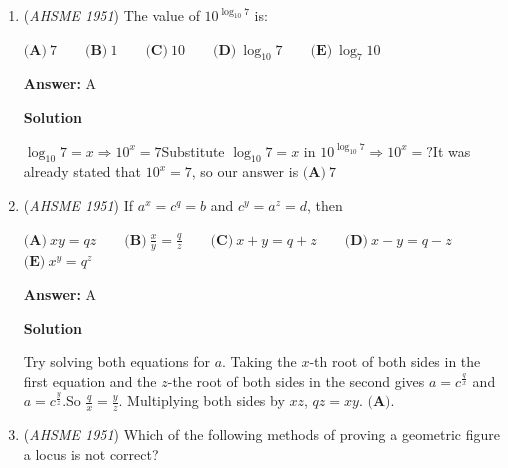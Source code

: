 \begin{enumerate}
 $\textbf{(A)}\ y = x^{2}, y = 2x\qquad\textbf{(B)}\ y = x^{2}-2x, y = 0\qquad\textbf{(C)}\ y = x, y = x-2\qquad\textbf{(D)}\ y = x^{2}-2x+1, y = 1$
$\textbf{(E)}\ y = x^{2}-1, y = 2x-1$


 \textit{[Note: Abscissa means x-coordinate.]}


 
 \textbf{Answer: }C



\textbf{Solution}

If you find the intersections of the curves listed in the answers $\textbf{(A)}$, $\textbf{(B)}$, $\textbf{(D)}$, and $\textbf{(E)}$, you will find that their abscissas are $0$ and $2$. Also you can note that the curves in $\textbf{(C)}$ don't actually intersect. Therefore the answer is $\boxed{\textbf{(C)}}$.

 


	\item (\textit{AHSME 1951}) The value of $10^{\log_{10}7}$ is: 


 $\textbf{(A)}\ 7\qquad\textbf{(B)}\ 1\qquad\textbf{(C)}\ 10\qquad\textbf{(D)}\ \log_{10}7\qquad\textbf{(E)}\ \log_{7}10$

 \textbf{Answer: }A



\textbf{Solution}

$\log_{10}7=x \Rightarrow 10^x=7$Substitute $\log_{10}7=x$ in $10^{\log_{10}7} \Rightarrow 10^x=?$It was already stated that $10^x=7$, so our answer is $\textbf{(A)}\ 7$



	\item (\textit{AHSME 1951}) If $a^{x}= c^{q}= b$ and $c^{y}= a^{z}= d$, then


 $\textbf{(A)}\ xy = qz\qquad\textbf{(B)}\ \frac{x}{y}=\frac{q}{z}\qquad\textbf{(C)}\ x+y = q+z\qquad\textbf{(D)}\ x-y = q-z$
$\textbf{(E)}\ x^{y}= q^{z}$

 \textbf{Answer: }A



\textbf{Solution}

Try solving both equations for $a$. Taking the $x$-th root of both sides in the first equation and the $z$-the root of both sides in the second gives $a=c^{\frac{q}x}$ and $a=c^{\frac{y}z}$.So $\frac{q}x=\frac{y}z$. Multiplying both sides by $xz$, $qz=xy$. $\boxed{\textbf{(A)}}$.

 


	\item (\textit{AHSME 1951}) Which of the following methods of proving a geometric figure a locus is not correct? 



\end{enumerate}
